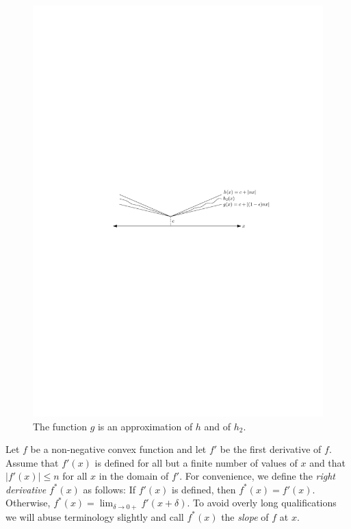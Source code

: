\documentclass[charterfonts,lotsofwhite]{patmorin}
\begin{document}
\begin{figure}
\begin{center}\includegraphics{trivial}\end{center}
\caption{The function $g$ is an approximation of $h$ and
of $h_2$.}
\end{figure}

Let $f$ be a non-negative convex function and let $f'$ be the first
derivative of $f$.  Assume that $f'(x)$ is defined for all but a
finite number of values of $x$ and that $|f'(x)|\le n$ for all $x$ in
the domain of $f'$.  For convenience, we define the \emph{right
derivative} $f^*(x)$ as follows: If $f'(x)$ is defined, then
$f^*(x)=f'(x)$.  Otherwise, $f^*(x)=\lim_{\delta\rightarrow 0+}
f'(x+\delta)$.  To avoid overly long qualifications we will abuse
terminology slightly and call $f^*(x)$ the \emph{slope} of $f$ at $x$.
\end{document}
